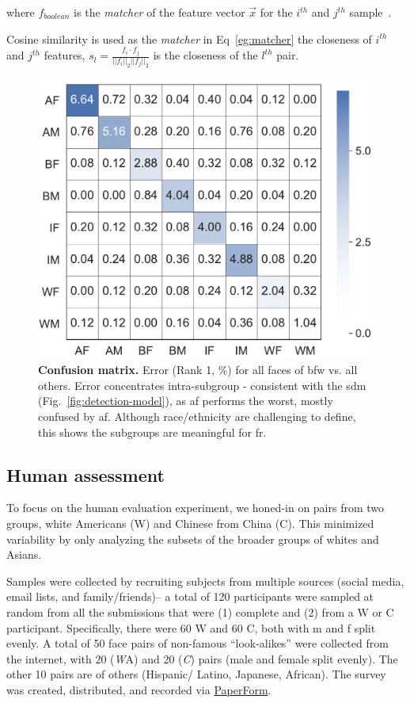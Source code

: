 where $f_{boolean}$ is the \textit{matcher} of the feature vector $\vec{x}$ for the $i^{th}$ and $j^{th}$ sample~\cite{LFWTech}.

Cosine similarity is used as the \emph{matcher} in Eq~\ref{eg:matcher} the closeness of $i^{th}$ and $j^{th}$ features, \ie
$
s_l= \frac{f_i\cdot f_j}{||f_i||_2||f_j||_2}
$ is the closeness of the $l^{th}$ pair. 

\begin{figure}[t!]
	\centering    
	\includegraphics[width=.75\linewidth]{figures/confusion.pdf}
		\caption{\small{\textbf{Confusion matrix.} Error (Rank 1, \%) for all faces of \gls{bfw} vs. all others. Error concentrates intra-subgroup - consistent with the \gls{sdm} (Fig.~\ref{fig:detection-model}), as \gls{af} performs the worst, mostly confused by \gls{af}. Although race/ethnicity are challenging to define, this shows the subgroups are meaningful for \gls{fr}.}}
		\label{fig:confusion} 
\end{figure} 

\subsection{Human assessment}\label{subsec:human-assessment}
To focus on the human evaluation experiment, we honed-in on pairs from two groups, white Americans (W) and Chinese from China (C). This minimized variability by only analyzing the subsets of the broader groups of whites and Asians. %

Samples were collected by recruiting subjects from multiple sources (\eg social media, email lists, and family/friends)-- a total of 120 participants were sampled at random from all the submissions that were (1) complete and (2) from a W or C participant. Specifically, there were 60 W and 60 C, both with \gls{m} and \gls{f} split evenly. A total of 50 face pairs of non-famous ``look-alikes'' were collected from the internet, with 20 ({\emph WA}) and 20 ({\emph C}) pairs (male and female split evenly). The other 10 pairs are of others (\eg Hispanic/ Latino, Japanese, African). The survey was created, distributed, and recorded via \href{https://paperform.co}{PaperForm}. 
